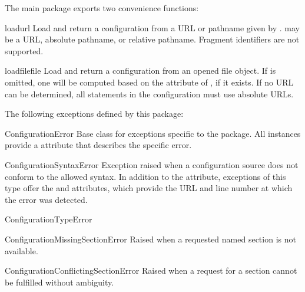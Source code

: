 \documentclass{howto}
\begin{document}

The main  package exports two convenience functions:

\begin{funcdesc}{load}{url}
  Load and return a configuration from a URL or pathname given by
  .   may be a URL, absolute pathname, or relative
  pathname.  Fragment identifiers are not supported.
\end{funcdesc}

\begin{funcdesc}{loadfile}{file}
  Load and return a configuration from an opened file object.
  If  is omitted, one will be computed based on the
   attribute of , if it exists.  If no URL can
  be determined, all  statements in the configuration
  must use absolute URLs.
\end{funcdesc}

The following exceptions defined by this package:

\begin{excdesc}{ConfigurationError}
  Base class for exceptions specific to the  package.
  All instances provide a  attribute that describes
  the specific error.
\end{excdesc}

\begin{excdesc}{ConfigurationSyntaxError}
  Exception raised when a configuration source does not conform to the
  allowed syntax.  In addition to the  attribute,
  exceptions of this type offer the  and 
  attributes, which provide the URL and line number at which the error
  was detected.
\end{excdesc}

\begin{excdesc}{ConfigurationTypeError}
\end{excdesc}

\begin{excdesc}{ConfigurationMissingSectionError}
  Raised when a requested named section is not available.
\end{excdesc}

\begin{excdesc}{ConfigurationConflictingSectionError}
  Raised when a request for a section cannot be fulfilled without
  ambiguity.
\end{excdesc}
\end{document}
